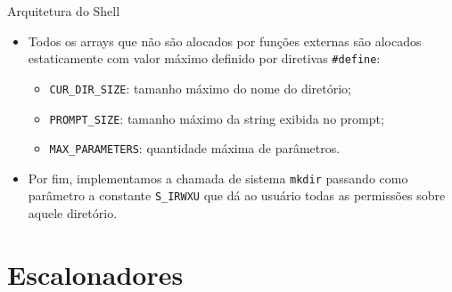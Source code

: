 \documentclass[10pt]{beamer}
\begin{document}
    \begin{frame}{Arquitetura do Shell}
      \begin{itemize}
        \justifying
        \item Todos os arrays que não são alocados por funções externas são alocados estaticamente com valor máximo definido por diretivas \texttt{\#define}:
        \begin{itemize}
          \item \texttt{CUR\_DIR\_SIZE}: tamanho máximo do nome do diretório;
          \item \texttt{PROMPT\_SIZE}: tamanho máximo da string exibida no prompt;
          \item \texttt{MAX\_PARAMETERS}: quantidade máxima de parâmetros.
        \end{itemize}
        \item Por fim, implementamos a chamada de sistema \texttt{mkdir} passando como parâmetro a constante \texttt{S\_IRWXU} que dá ao usuário todas as permissões sobre aquele diretório.
      \end{itemize}
    \end{frame}
    \section{Escalonadores}
\end{document}
